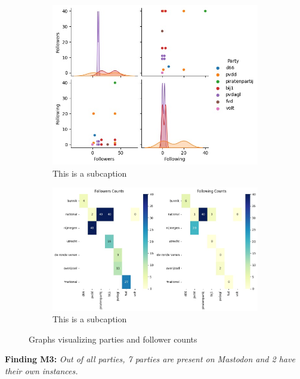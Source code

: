 \begin{figure}[ht]
  \centering
  \begin{subfigure}[h]{.49\linewidth}
    \includegraphics[width=\textwidth]{media/parties-following-counts.jpeg}
    \captionsetup{justification=centering}
    \caption{This is a subcaption}
    \label{fig:partyfollowers}
  \end{subfigure}
  \begin{subfigure}[h]{.49\linewidth}
      \captionsetup{justification=centering}
      \includegraphics[width=\textwidth]{media/parties-following-region-counts.jpeg}
      \caption{This is a subcaption}
      \label{fig:partyfollowingregions}
  \end{subfigure}
  \caption{Graphs visualizing parties and follower counts}
  \label{fig:partyfollowerstotal}
\end{figure}


\textbf{Finding M3:} \textit{Out of all parties, 7 parties are present on Mastodon and 2 have their own instances.}
